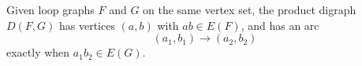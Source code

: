 \begin{definition}
Given loop graphs \(F\) and \(G\) on the same vertex set, the product digraph \(D(F,G)\) has vertices \((a,b)\) with \(ab\in E(F)\), and has an arc
\[
  (a_1,b_1)\to(a_2,b_2)
\]
exactly when \(a_1b_2\in E(G)\).
\end{definition}
